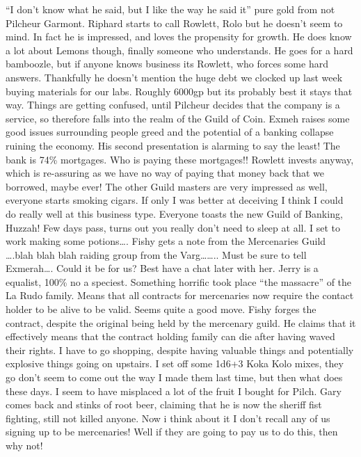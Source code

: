 “I don’t know what he said, but I like the way he said it” pure gold from not Pilcheur Garmont.\medskip
Riphard starts to call Rowlett, Rolo but he doesn’t seem to mind. In fact he is impressed, and loves the propensity for growth. He does know a lot about Lemons though, finally someone who understands. He goes for a hard bamboozle, but if anyone knows business its Rowlett, who forces some hard answers. Thankfully he doesn’t mention the huge debt we clocked up last week buying materials for our labs. Roughly 6000gp but its probably best it stays that way. Things are getting confused, until Pilcheur decides that the company is a service, so therefore falls into the realm of the Guild of Coin.\medskip
Exmeh raises some good issues surrounding people greed and the potential of a banking collapse ruining the economy. His second presentation is alarming to say the least! The bank is 74\% mortgages. Who is paying these mortgages!!\medskip
Rowlett invests anyway, which is re-assuring as we have no way of paying that money back that we borrowed, maybe ever!\medskip
The other Guild masters are very impressed as well, everyone starts smoking cigars. If only I was better at deceiving I think I could do really well at this business type.\medskip
Everyone toasts the new Guild of Banking, Huzzah!\medskip
Few days pass, turns out you really don’t need to sleep at all. I set to work making some potions….\medskip
Fishy gets a note from the Mercenaries Guild ….blah blah blah raiding group from the Varg…….. Must be sure to tell Exmerah…. Could it be for us? Best have a chat later with her.\medskip
Jerry is a equalist, 100\% no a speciest. Something horrific took place “the massacre” of the La Rudo family. Means that all contracts for mercenaries now require the contact holder to be alive to be valid. Seems quite a good move.\medskip
Fishy forges the contract, despite the original being held by the mercenary guild. He claims that it effectively means that the contract holding family can die after having waved their rights.\medskip
I have to go shopping, despite having valuable things and potentially explosive things going on upstairs. I set off some 1d6+3 Koka Kolo mixes, they go don’t seem to come out the way I made them last time, but then what does these days. I seem to have misplaced a lot of the fruit I bought for Pilch.\medskip
Gary comes back and stinks of root beer, claiming that he is now the sheriff fist fighting, still not killed anyone.\medskip
Now i think about it I don’t recall any of us signing up to be mercenaries! Well if they are going to pay us to do this, then why not!\medskip
